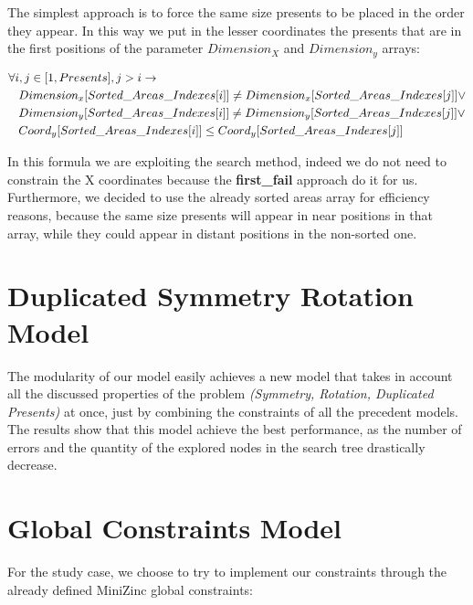 The simplest approach is to force the same size presents to be placed in the order they appear. In this way we put in the lesser
coordinates the presents that are in the first positions of the parameter $Dimension_X$ and $Dimension_y$ arrays:

\begin{equation*}\begin{split}
    &\forall i, j \in [1, Presents], j > i \rightarrow \\
    &\hspace{0.3cm} Dimension_x[Sorted\_Areas\_Indexes[i]] \neq Dimension_x[Sorted\_Areas\_Indexes[j]] \lor \\
    &\hspace{0.3cm} Dimension_y[Sorted\_Areas\_Indexes[i]] \neq Dimension_y[Sorted\_Areas\_Indexes[j]] \lor\\
    &\hspace{0.3cm} Coord_y[Sorted\_Areas\_Indexes[i]] \leq Coord_y[Sorted\_Areas\_Indexes[j]]
\end{split}\end{equation*}

In this formula we are exploiting the search method, indeed we do not need to constrain the X coordinates because the \textbf{first\_fail}
approach do it for us. Furthermore, we decided to use the already sorted areas array for efficiency reasons, because the same size
presents will appear in near positions in that array, while they could appear in distant positions in the non-sorted one. 



\newpage
\section{Duplicated Symmetry Rotation Model}
The modularity of our model easily achieves a new model that takes in account all the discussed properties of the problem
\textit{(Symmetry, Rotation, Duplicated Presents)} at once, just by combining the constraints of all the precedent models.
The results show that this model achieve the best performance, as the number of errors and the quantity of the explored nodes in the
search tree drastically decrease.  



\newpage
\section{Global Constraints Model}
For the study case, we choose to try to implement our constraints through the already defined MiniZinc global constraints:

